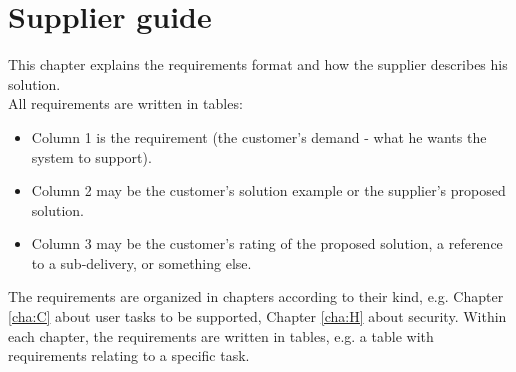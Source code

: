 \documentclass[Main]{subfiles}
\begin{document}
\section{Supplier guide}

This chapter explains the requirements format and how the supplier describes his solution.
\\
All requirements are written in tables:
\begin{itemize}
\item Column 1 is the requirement (the customer's demand - what he wants the system to support). 

\item Column 2 may be the customer's solution example or the supplier's proposed solution.

\item Column 3 may be the customer's rating of the proposed solution, a reference to a sub-delivery, or something else.

\end{itemize}

The requirements are organized in chapters according to their kind, e.g. Chapter \ref{cha:C} about user tasks to be supported, Chapter \ref{cha:H} about security. 
Within each chapter, the requirements are written in tables, e.g. a table with requirements relating to a specific task. 
\end{document}

